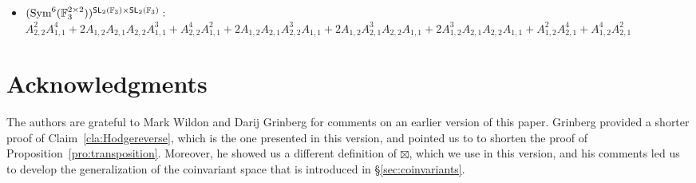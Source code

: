 \documentclass[a4paper]{extarticle}
\newcommand{\IF}{\mathbb{F}}
\newcommand{\SL}{\textsf{\textup{SL}}}
\newcommand{\Sym}{\textup{Sym}}
\numberwithin{theorem}{section}
\theoremstyle{definition}
\begin{document}
\begin{itemize}
\begin{itemize}
	\item[$\bullet$] $A_{2,2} A_{1,1}^5+A_{2,1}^2 A_{1,1}^4+A_{1,2} A_{2,1} A_{1,1}^4+A_{2,1} A_{2,2} A_{1,1}^4+A_{1,2} A_{2,2}^2 A_{1,1}^3+A_{1,2}^2 A_{2,2} A_{1,1}^3+A_{2,1}^4 A_{1,1}^2+A_{2,1} A_{2,2}^3A_{1,1}^2+A_{1,2}^3 A_{2,1} A_{1,1}^2+A_{1,2}^2 A_{2,1} A_{2,2} A_{1,1}^2+A_{2,2}^5 A_{1,1}+A_{1,2} A_{2,1}^4 A_{1,1}+A_{1,2} A_{2,2}^4 A_{1,1}+A_{2,1}^2 A_{2,2}^3 A_{1,1}+A_{1,2}^3 A_{2,1}^2A_{1,1}+A_{1,2} A_{2,1}^2 A_{2,2}^2 A_{1,1}+A_{1,2}^4 A_{2,2} A_{1,1}+A_{2,1}^4 A_{2,2} A_{1,1}+A_{1,2} A_{2,1}^5+A_{1,2}^2 A_{2,2}^4+A_{1,2} A_{2,1} A_{2,2}^4+A_{1,2}^4 A_{2,2}^2+A_{1,2}A_{2,1}^3 A_{2,2}^2+A_{1,2}^5 A_{2,1}+A_{1,2}^2 A_{2,1}^3 A_{2,2}+A_{1,2}^4 A_{2,1} A_{2,2}$

	\item[$\bullet$] $A_{2,2}^2 A_{1,1}^4+A_{2,2}^4 A_{1,1}^2+A_{1,2}^2 A_{2,1}^4+A_{1,2}^4 A_{2,1}^2$

	\item[$\bullet$] $A_{2,1}^2 A_{1,1}^4+A_{2,1} A_{2,2} A_{1,1}^4+A_{2,2}^3 A_{1,1}^3+A_{2,1} A_{2,2}^2 A_{1,1}^3+A_{2,1}^2 A_{2,2} A_{1,1}^3+A_{2,1}^4 A_{1,1}^2+A_{1,2} A_{2,1}^3 A_{1,1}^2+A_{1,2} A_{2,2}^3A_{1,1}^2+A_{1,2}^2 A_{2,1}^2 A_{1,1}^2+A_{1,2}^2 A_{2,2}^2 A_{1,1}^2+A_{2,1}^2 A_{2,2}^2 A_{1,1}^2+A_{1,2}^2 A_{2,1} A_{2,2} A_{1,1}^2+A_{1,2} A_{2,1}^4 A_{1,1}+A_{1,2} A_{2,2}^4A_{1,1}+A_{1,2}^2 A_{2,1}^3 A_{1,1}+A_{1,2}^2 A_{2,2}^3 A_{1,1}+A_{1,2} A_{2,1}^2 A_{2,2}^2 A_{1,1}+A_{1,2}^2 A_{2,2}^4+A_{1,2}^3 A_{2,1}^3+A_{1,2}^4 A_{2,2}^2+A_{1,2}^2 A_{2,1}^2A_{2,2}^2+A_{1,2}^3 A_{2,1} A_{2,2}^2+A_{1,2}^3 A_{2,1}^2 A_{2,2}+A_{1,2}^4 A_{2,1} A_{2,2}$
    \end{itemize}

	\item $(\Sym^6(\IF_3^{2\times2}))^{\SL_2(\IF_3)\times \SL_2(\IF_3)}:$\\$A_{2,2}^2 A_{1,1}^4+2 A_{1,2} A_{2,1} A_{2,2} A_{1,1}^3+A_{2,2}^4 A_{1,1}^2+2 A_{1,2} A_{2,1} A_{2,2}^3 A_{1,1}+2 A_{1,2} A_{2,1}^3 A_{2,2} A_{1,1}+2 A_{1,2}^3 A_{2,1} A_{2,2} A_{1,1}+A_{1,2}^2A_{2,1}^4+A_{1,2}^4 A_{2,1}^2$

\end{itemize}

\section*{Acknowledgments}
The authors are grateful to Mark Wildon and Darij Grinberg for comments on an earlier version of this paper.
Grinberg provided a shorter proof of Claim~\ref{cla:Hodgereverse}, which is the one presented in this version, and pointed us to \cite[eq.~(1.7)]{MacD98} to shorten the proof of Proposition~\ref{pro:transposition}.
Moreover, he showed us a different definition of $\boxtimes$, which we use in this version, and his comments led us to develop the generalization of the coinvariant space that is introduced in \S\ref{sec:coinvariants}.



\end{document}
